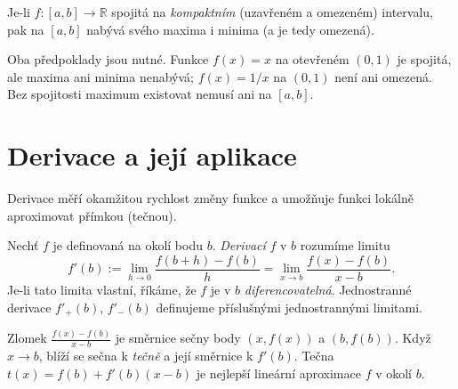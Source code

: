 \documentclass[11pt,a4paper]{article}
\begin{document}
\begin{veta}
Je-li $f:[a,b]\to\mathbb{R}$ spojitá na \emph{kompaktním} (uzavřeném a omezeném) intervalu, pak na $[a,b]$ nabývá svého maxima i minima (a je tedy omezená).
\end{veta}

\begin{poznamka}
Oba předpoklady jsou nutné. Funkce $f(x)=x$ na otevřeném $(0,1)$ je spojitá, ale maxima ani minima nenabývá; $f(x)=1/x$ na $(0,1)$ není ani omezená. Bez spojitosti maximum existovat nemusí ani na $[a,b]$.
\end{poznamka}


\section{Derivace a její aplikace}

Derivace měří okamžitou rychlost změny funkce a umožňuje funkci lokálně aproximovat přímkou (tečnou).

\begin{definice}
Nechť $f$ je definovaná na okolí bodu $b$. \emph{Derivací} $f$ v $b$ rozumíme limitu
\[
  f'(b):=\lim_{h\to0}\frac{f(b+h)-f(b)}{h}=\lim_{x\to b}\frac{f(x)-f(b)}{x-b}.
\]
Je-li tato limita vlastní, říkáme, že $f$ je v $b$ \emph{diferencovatelná}. Jednostranné derivace $f'_+(b)$, $f'_-(b)$ definujeme příslušnými jednostrannými limitami.
\end{definice}

\begin{intuice}
Zlomek $\tfrac{f(x)-f(b)}{x-b}$ je směrnice sečny body $(x,f(x))$ a $(b,f(b))$. Když $x\to b$, blíží se sečna k \emph{tečně} a její směrnice k $f'(b)$. Tečna $t(x)=f(b)+f'(b)(x-b)$ je nejlepší lineární aproximace $f$ v okolí $b$.
\end{intuice}

\begin{center}
\end{center}
\end{document}
